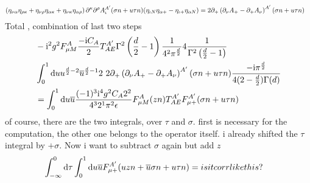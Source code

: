 \begin{align}
	\left(  \eta_{\nu \alpha} \eta_{\rho \kappa}+ \eta_{\nu \rho} \eta_{\alpha\kappa} + \eta_{\nu \kappa} \eta_{\alpha \rho} \right) \partial^\kappa\partial^\rho A_\iota^{A'} (\sigma n+u\tau n)(\eta_{\iota N}\eta_{\alpha +} - \eta_{\iota+ }\eta_{\alpha N})
	&=
	2 \partial_+\left( \partial_\nu A_+ - \partial_+A_\nu\right)^{A'}(\sigma n + u \tau n)
\end{align}
Total , combination of last two steps
\begin{align}
	&-\text{i}^2 g^2 F_{\mu M}^{A}\frac{-\text{i} C_A}{2} T^{A'}_{AE}\Gamma^2\left(\frac{d}{2}-1\right)\frac{1}{4^2\pi^\frac{d}{2}}4 \frac{1}{\Gamma^2\left(\frac{d}{2}-1\right)}
	\\
	&\int_0^1 \text{d} u u^{\frac{d}{2}-2}\overline u^{\frac{d}{2}-1}2~2 \partial_+\left( \partial_\nu A_+ - \partial_+A_\nu\right)^{A'}(\sigma n + u \tau n)\frac{-\text{i} \pi^{\frac{d}{2}}}{4(2-\frac{d}{2})\Gamma(d)}
	\\
	&=
	\int_0^1 \text{d} u \overline u\frac{(-1)^3\text{i}^{4}g^2C_A2^2}{4^3 2^1\pi^2\epsilon}F_{\mu M}^{A}(zn)T^{A'}_{AE}F_{\mu +}^{A'}(\sigma n + u \tau n)
\end{align}
of course, there are the two integrals, over $\tau$ and $\sigma$. first is necessary for the computation, the other one belongs to the operator itself.
i already shifted the $\tau $ integral by $+\sigma$. Now i want to subtract $\sigma$ again but add $z$
\begin{align}
	\int_{-\infty}^{0} \text{d} \tau \int_0^1 \text{d} u \overline u F_{\mu +}^{A'}(u zn + \overline u\sigma n + u \tau n)
	&=
	is it corr like this?
\end{align}
\ifdefined\mainprogram{}
\else

\fi